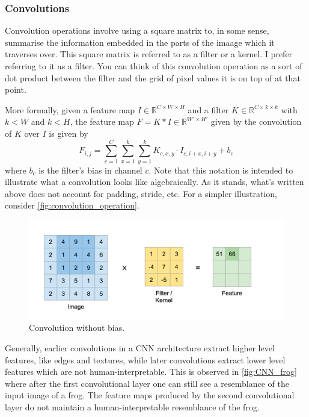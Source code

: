 \documentclass[11pt]{article}
\begin{document}
\subsubsection{Convolutions}
Convolution operations involve using a square matrix to, in some sense, summarise the information embedded in the parts of the imaage which it traverses over. This square matrix is referred to as a filter or a kernel. I prefer referring to it as a filter. You can think of this convolution operation as a sort of dot product between the filter and the grid of pixel values it is on top of at that point.

More formally, given a feature map $I\in\mathbb{R}^{C\times W\times H}$ and a filter $K\in\mathbb{R}^{C\times k\times k}$ with $k<W$ and $k<H$, the feature map $F=K*I\in\mathbb{R}^{W'\times H'}$ given by the convolution of $K$ over $I$ is given by
$$
F_{i,j}
=
\sum_{c=1}^C\sum_{x=1}^{k}\sum_{y=1}^{k}K_{c,x,y}\cdot I_{c,i+x,i+y}+b_c
$$
where $b_c$ is the filter's bias in channel $c$. Note that this notation is intended to illustrate what a convolution looks like algebraically. As it stands, what's written above does not account for padding, stride, etc. For a simpler illustration, consider \autoref{fig:convolution_operation}.

\begin{figure}[t]
    \centering
    \includegraphics[width=1\textwidth]{./figures/neural_nets/CNN_convolution.png}
    \caption{Convolution without bias. }
    \label{fig:convolution_operation}
\end{figure}

Generally, earlier convolutions in a CNN architecture extract higher level features, like edges and textures, while later convolutions extract lower level features which are not human-interpretable. This is observed in \autoref{fig:CNN_frog} where after the first convolutional layer one can still see a resemblance of the input image of a frog. The feature maps produced by the second convolutional layer do not maintain a human-interpretable resemblance of the frog.
\end{document}
